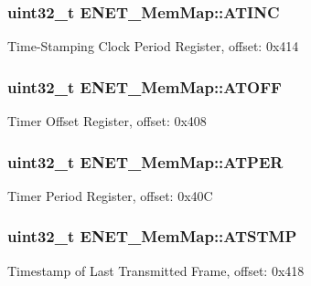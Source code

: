 \subsubsection[{A\+T\+I\+N\+C}]{\setlength{\rightskip}{0pt plus 5cm}uint32\+\_\+t E\+N\+E\+T\+\_\+\+Mem\+Map\+::\+A\+T\+I\+N\+C}\label{struct_e_n_e_t___mem_map_a9456f8f8040c7789e37035dc19caee16}
Time-\/\+Stamping Clock Period Register, offset\+: 0x414 \hypertarget{struct_e_n_e_t___mem_map_a34292bff9f9d70253953a1814ce46991}{}
\subsubsection[{A\+T\+O\+F\+F}]{\setlength{\rightskip}{0pt plus 5cm}uint32\+\_\+t E\+N\+E\+T\+\_\+\+Mem\+Map\+::\+A\+T\+O\+F\+F}\label{struct_e_n_e_t___mem_map_a34292bff9f9d70253953a1814ce46991}
Timer Offset Register, offset\+: 0x408 \hypertarget{struct_e_n_e_t___mem_map_a37be83627f6f5f7fb967292d2f53e294}{}
\subsubsection[{A\+T\+P\+E\+R}]{\setlength{\rightskip}{0pt plus 5cm}uint32\+\_\+t E\+N\+E\+T\+\_\+\+Mem\+Map\+::\+A\+T\+P\+E\+R}\label{struct_e_n_e_t___mem_map_a37be83627f6f5f7fb967292d2f53e294}
Timer Period Register, offset\+: 0x40\+C \hypertarget{struct_e_n_e_t___mem_map_afc576420775d6124f0ed3ced438ba89e}{}
\subsubsection[{A\+T\+S\+T\+M\+P}]{\setlength{\rightskip}{0pt plus 5cm}uint32\+\_\+t E\+N\+E\+T\+\_\+\+Mem\+Map\+::\+A\+T\+S\+T\+M\+P}\label{struct_e_n_e_t___mem_map_afc576420775d6124f0ed3ced438ba89e}
Timestamp of Last Transmitted Frame, offset\+: 0x418 \hypertarget{struct_e_n_e_t___mem_map_a28e2d519809c574a0b4c3161bfe16545}{}
